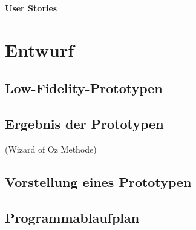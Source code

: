 



\textbf{User Stories}





\section{Entwurf}

\subsection{Low-Fidelity-Prototypen}

\subsection{Ergebnis der Prototypen}
(Wizard of Oz Methode)

\subsection{Vorstellung eines Prototypen}

\subsection{Programmablaufplan}
